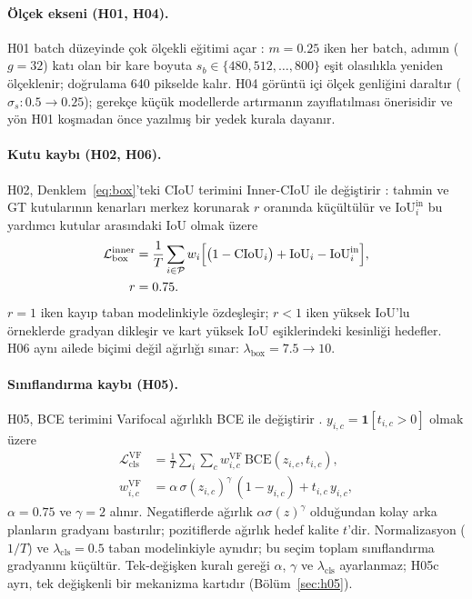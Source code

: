 \documentclass[pdflatex,iicol,sn-mathphys-num]{sn-jnl}
\begin{document}
\paragraph{Ölçek ekseni (H01, H04).}
H01 batch düzeyinde çok ölçekli eğitimi açar \cite{redmon_2017_yolo9000}: $m=0.25$ iken her batch, adımın ($g=32$) katı olan bir kare boyuta $s_b\in\{480,512,\dots,800\}$ eşit olasılıkla yeniden ölçeklenir; doğrulama 640 pikselde kalır. H04 görüntü içi ölçek genliğini daraltır ($\sigma_s:0.5\to0.25$); gerekçe küçük modellerde artırmanın zayıflatılması önerisidir \cite{ge_2021_yolox} ve yön H01 koşmadan önce yazılmış bir yedek kurala dayanır.

\paragraph{Kutu kaybı (H02, H06).}
H02, Denklem~\eqref{eq:box}'teki CIoU terimini Inner-CIoU ile değiştirir \cite{zhang_2023_inneriou}: tahmin ve GT kutularının kenarları merkez korunarak $r$ oranında küçültülür ve $\mathrm{IoU}^{\mathrm{in}}_i$ bu yardımcı kutular arasındaki IoU olmak üzere
\begin{equation}\label{eq:inner}
\begin{aligned}
\mathcal L_{\mathrm{box}}^{\mathrm{inner}}&=\frac1T\sum_{i\in\mathcal P}w_i\Bigl[\bigl(1-\mathrm{CIoU}_i\bigr)+\mathrm{IoU}_i-\mathrm{IoU}^{\mathrm{in}}_i\Bigr],\\
r&=0.75.
\end{aligned}
\end{equation}
$r=1$ iken kayıp taban modelinkiyle özdeşleşir; $r<1$ iken yüksek IoU'lu örneklerde gradyan dikleşir ve kart yüksek IoU eşiklerindeki kesinliği hedefler. H06 aynı ailede biçimi değil ağırlığı sınar: $\lambda_{\mathrm{box}}=7.5\to10$.

\paragraph{Sınıflandırma kaybı (H05).}
H05, BCE terimini Varifocal ağırlıklı BCE ile değiştirir \cite{zhang_2021_varifocalnet}. $y_{i,c}=\mathbf{1}[t_{i,c}>0]$ olmak üzere
\begin{equation}\label{eq:vfl}
\begin{aligned}
\mathcal L_{\mathrm{cls}}^{\mathrm{VF}}&=\frac1T\sum_{i}\sum_{c}w^{\mathrm{VF}}_{i,c}\,\mathrm{BCE}(z_{i,c},t_{i,c}),\\
w^{\mathrm{VF}}_{i,c}&=\alpha\,\sigma(z_{i,c})^{\gamma}\,(1-y_{i,c})+t_{i,c}\,y_{i,c},
\end{aligned}
\end{equation}
$\alpha=0.75$ ve $\gamma=2$ alınır. Negatiflerde ağırlık $\alpha\sigma(z)^{\gamma}$ olduğundan kolay arka planların gradyanı bastırılır; pozitiflerde ağırlık hedef kalite $t$'dir. Normalizasyon ($1/T$) ve $\lambda_{\mathrm{cls}}=0.5$ taban modelinkiyle aynıdır; bu seçim toplam sınıflandırma gradyanını küçültür. Tek-değişken kuralı gereği $\alpha$, $\gamma$ ve $\lambda_{\mathrm{cls}}$ ayarlanmaz; H05c ayrı, tek değişkenli bir mekanizma kartıdır (Bölüm~\ref{sec:h05}).
\end{document}
